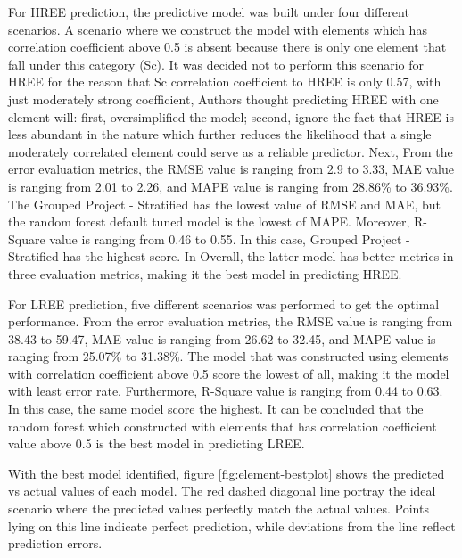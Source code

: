 \documentclass[11pt,a4paper,]{article}
\begin{document}
For HREE prediction, the predictive model was built under four different scenarios. A scenario where we construct the model with elements which has correlation coefficient above 0.5 is absent because there is only one element that fall under this category (Sc). It was decided not to perform this scenario for HREE for the reason that Sc correlation coefficient to HREE is only 0.57, with just moderately strong coefficient, Authors thought predicting HREE with one element will: first, oversimplified the model; second, ignore the fact that HREE is less abundant in the nature which further reduces the likelihood that a single moderately correlated element could serve as a reliable predictor. Next, From the error evaluation metrics, the RMSE value is ranging from 2.9 to 3.33, MAE value is ranging from 2.01 to 2.26, and MAPE value is ranging from 28.86\% to 36.93\%. The Grouped Project - Stratified has the lowest value of RMSE and MAE, but the random forest default tuned model is the lowest of MAPE. Moreover, R-Square value is ranging from 0.46 to 0.55. In this case, Grouped Project - Stratified has the highest score. In Overall, the latter model has better metrics in three evaluation metrics, making it the best model in predicting HREE.

For LREE prediction, five different scenarios was performed to get the optimal performance. From the error evaluation metrics, the RMSE value is ranging from 38.43 to 59.47, MAE value is ranging from 26.62 to 32.45, and MAPE value is ranging from 25.07\% to 31.38\%. The model that was constructed using elements with correlation coefficient above 0.5 score the lowest of all, making it the model with least error rate. Furthermore, R-Square value is ranging from 0.44 to 0.63. In this case, the same model score the highest. It can be concluded that the random forest which constructed with elements that has correlation coefficient value above 0.5 is the best model in predicting LREE.

With the best model identified, figure \ref{fig:element-bestplot} shows the predicted vs actual values of each model. The red dashed diagonal line portray the ideal scenario where the predicted values perfectly match the actual values. Points lying on this line indicate perfect prediction, while deviations from the line reflect prediction errors.
\end{document}
